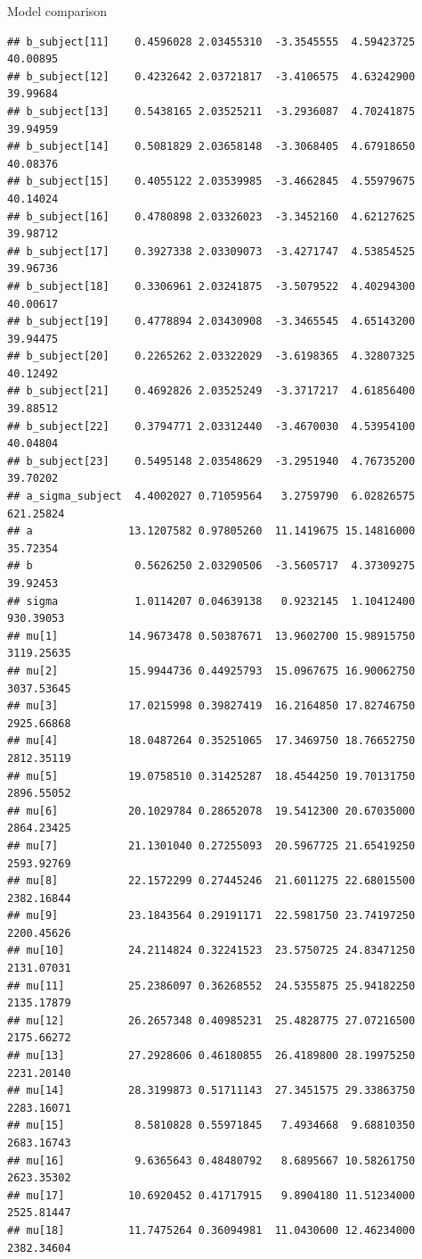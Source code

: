 \documentclass[
  ignorenonframetext,
]{beamer}
\begin{document}
\begin{frame}[fragile]{Model comparison}
\begin{verbatim}
## b_subject[11]    0.4596028 2.03455310  -3.3545555  4.59423725   40.00895
## b_subject[12]    0.4232642 2.03721817  -3.4106575  4.63242900   39.99684
## b_subject[13]    0.5438165 2.03525211  -3.2936087  4.70241875   39.94959
## b_subject[14]    0.5081829 2.03658148  -3.3068405  4.67918650   40.08376
## b_subject[15]    0.4055122 2.03539985  -3.4662845  4.55979675   40.14024
## b_subject[16]    0.4780898 2.03326023  -3.3452160  4.62127625   39.98712
## b_subject[17]    0.3927338 2.03309073  -3.4271747  4.53854525   39.96736
## b_subject[18]    0.3306961 2.03241875  -3.5079522  4.40294300   40.00617
## b_subject[19]    0.4778894 2.03430908  -3.3465545  4.65143200   39.94475
## b_subject[20]    0.2265262 2.03322029  -3.6198365  4.32807325   40.12492
## b_subject[21]    0.4692826 2.03525249  -3.3717217  4.61856400   39.88512
## b_subject[22]    0.3794771 2.03312440  -3.4670030  4.53954100   40.04804
## b_subject[23]    0.5495148 2.03548629  -3.2951940  4.76735200   39.70202
## a_sigma_subject  4.4002027 0.71059564   3.2759790  6.02826575  621.25824
## a               13.1207582 0.97805260  11.1419675 15.14816000   35.72354
## b                0.5626250 2.03290506  -3.5605717  4.37309275   39.92453
## sigma            1.0114207 0.04639138   0.9232145  1.10412400  930.39053
## mu[1]           14.9673478 0.50387671  13.9602700 15.98915750 3119.25635
## mu[2]           15.9944736 0.44925793  15.0967675 16.90062750 3037.53645
## mu[3]           17.0215998 0.39827419  16.2164850 17.82746750 2925.66868
## mu[4]           18.0487264 0.35251065  17.3469750 18.76652750 2812.35119
## mu[5]           19.0758510 0.31425287  18.4544250 19.70131750 2896.55052
## mu[6]           20.1029784 0.28652078  19.5412300 20.67035000 2864.23425
## mu[7]           21.1301040 0.27255093  20.5967725 21.65419250 2593.92769
## mu[8]           22.1572299 0.27445246  21.6011275 22.68015500 2382.16844
## mu[9]           23.1843564 0.29191171  22.5981750 23.74197250 2200.45626
## mu[10]          24.2114824 0.32241523  23.5750725 24.83471250 2131.07031
## mu[11]          25.2386097 0.36268552  24.5355875 25.94182250 2135.17879
## mu[12]          26.2657348 0.40985231  25.4828775 27.07216500 2175.66272
## mu[13]          27.2928606 0.46180855  26.4189800 28.19975250 2231.20140
## mu[14]          28.3199873 0.51711143  27.3451575 29.33863750 2283.16071
## mu[15]           8.5810828 0.55971845   7.4934668  9.68810350 2683.16743
## mu[16]           9.6365643 0.48480792   8.6895667 10.58261750 2623.35302
## mu[17]          10.6920452 0.41717915   9.8904180 11.51234000 2525.81447
## mu[18]          11.7475264 0.36094981  11.0430600 12.46234000 2382.34604

\end{verbatim}
\end{frame}
\end{document}
